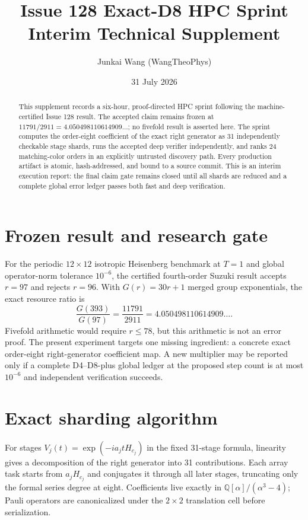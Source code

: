 \documentclass[10pt]{article}
\title{Issue 128 Exact-D8 HPC Sprint\\\large Interim Technical Supplement}
\author{Junkai Wang (WangTheoPhys)}
\date{31 July 2026}
\begin{document}
\maketitle

\begin{abstract}
This supplement records a six-hour, proof-directed HPC sprint following the
machine-certified Issue 128 result.  The accepted claim remains frozen at
$11791/2911=4.050498110614909\ldots$; no fivefold result is asserted here.
The sprint computes the order-eight coefficient of the exact right generator
as 31 independently checkable stage shards, runs the accepted deep verifier
independently, and ranks 24 matching-color orders in an explicitly untrusted
discovery path.  Every production artifact is atomic, hash-addressed, and
bound to a source commit.  This is an interim execution report: the final
claim gate remains closed until all shards are reduced and a complete global
error ledger passes both fast and deep verification.
\end{abstract}

\section{Frozen result and research gate}

For the periodic $12\times12$ isotropic Heisenberg benchmark at $T=1$ and
global operator-norm tolerance $10^{-6}$, the certified fourth-order Suzuki
result accepts $r=97$ and rejects $r=96$.  With $G(r)=30r+1$ merged group
exponentials, the exact resource ratio is
\[
  \frac{G(393)}{G(97)}=\frac{11791}{2911}
  =4.050498110614909\ldots .
\]
Fivefold arithmetic would require $r\le78$, but this arithmetic is not an
error proof.  The present experiment targets one missing ingredient: a
concrete exact order-eight right-generator coefficient map.  A new multiplier
may be reported only if a complete D4--D8-plus global ledger at the proposed
step count is at most $10^{-6}$ and independent verification succeeds.

\section{Exact sharding algorithm}

For stages $V_j(t)=\exp(-i a_j t H_{c_j})$ in the fixed 31-stage formula,
linearity gives a decomposition of the right generator into 31 contributions.
Each array task starts from $a_jH_{c_j}$ and conjugates it through all later
stages, truncating only the formal series degree at eight.  Coefficients live
exactly in $\mathbb{Q}[\alpha]/(\alpha^3-4)$; Pauli operators are canonicalized
under the $2\times2$ translation cell before serialization.
\end{document}
